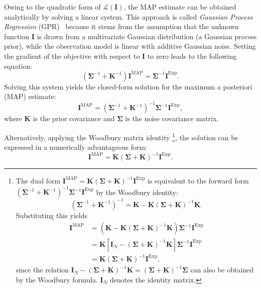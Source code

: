 \documentclass[12pt]{article}
\begin{document}
Owing to the quadratic form of \( \mathcal{L}(\mathbf{I}) \), the MAP estimate can be obtained analytically by solving a linear system. This approach is called \emph{Gaussian Process Regression} (GPR)~\cite{jeffreys1939, Gelman2013, williams1996gaussian, williams1998prediction, GPR} because it stems from the assumption that the unknown function \( \mathbf{I} \) is drawn from a multivariate Gaussian distribution (a Gaussian process prior), while the observation model is linear with additive Gaussian noise. Setting the gradient of the objective with respect to \( \mathbf{I} \) to zero leads to the following equation:
\begin{equation}
    \left( \boldsymbol{\Sigma}^{-1} + \mathbf{K}^{-1} \right) \mathbf{I}^{\mathrm{MAP}} = \boldsymbol{\Sigma}^{-1} \mathbf{I}^{\mathrm{Exp}}.
    \label{zero_gradient}
\end{equation}
Solving this system yields the closed-form solution for the maximum a posteriori (MAP) estimate:
\begin{equation}
    \mathbf{I}^{\mathrm{MAP}} = \left( \boldsymbol{\Sigma}^{-1} + \mathbf{K}^{-1} \right)^{-1} \boldsymbol{\Sigma}^{-1} \mathbf{I}^{\mathrm{Exp}},
    \label{MAP_SANS_forward}
\end{equation}
where \( \mathbf{K} \) is the prior covariance and \( \boldsymbol{\Sigma} \) is the noise covariance matrix.

Alternatively, applying the Woodbury matrix identity
\footnote{
The dual form 
\(
\mathbf{I}^{\mathrm{MAP}} = \mathbf{K} (\boldsymbol{\Sigma} + \mathbf{K})^{-1} \mathbf{I}^{\mathrm{Exp}}
\)
is equivalent to the forward form 
\(
\left( \boldsymbol{\Sigma}^{-1} + \mathbf{K}^{-1} \right)^{-1} \boldsymbol{\Sigma}^{-1} \mathbf{I}^{\mathrm{Exp}}
\)
by the Woodbury identity:
\[
\left( \boldsymbol{\Sigma}^{-1} + \mathbf{K}^{-1} \right)^{-1} = \mathbf{K} - \mathbf{K} (\boldsymbol{\Sigma} + \mathbf{K})^{-1} \mathbf{K}.
\]
Substituting this yields
\[
\begin{aligned}
\mathbf{I}^{\mathrm{MAP}} 
&= \left( \mathbf{K} - \mathbf{K} (\boldsymbol{\Sigma} + \mathbf{K})^{-1} \mathbf{K} \right) \boldsymbol{\Sigma}^{-1} \mathbf{I}^{\mathrm{Exp}} \\
&= \mathbf{K} \left[ \mathbf{I}_N - (\boldsymbol{\Sigma} + \mathbf{K})^{-1} \mathbf{K} \right] \boldsymbol{\Sigma}^{-1} \mathbf{I}^{\mathrm{Exp}} \\
&= \mathbf{K} (\boldsymbol{\Sigma} + \mathbf{K})^{-1} \mathbf{I}^{\mathrm{Exp}},
\end{aligned}
\]
since the relation
\(
\mathbf{I}_N - (\boldsymbol{\Sigma} + \mathbf{K})^{-1} \mathbf{K} = (\boldsymbol{\Sigma} + \mathbf{K})^{-1} \boldsymbol{\Sigma}
\) can also be obtained by the Woodbury formula. \(\mathbf{I}_N\) denotes the identity matrix.
}, the solution can be expressed in a numerically advantageous form:
\begin{equation}
    \mathbf{I}^{\mathrm{MAP}} = \mathbf{K} \left( \boldsymbol{\Sigma} + \mathbf{K} \right)^{-1} \mathbf{I}^{\mathrm{Exp}}.
    \label{MAP_SANS_dual}
\end{equation}
\end{document}
